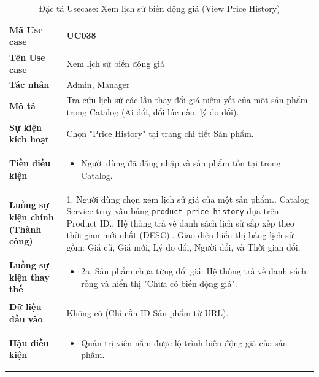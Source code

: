 \documentclass[12pt,a4paper]{report}
\begin{document}
\begin{longtable}{|>{\raggedright\arraybackslash\bfseries}p{4.5cm}|p{11cm}|}
\caption{Đặc tả Usecase: Xem lịch sử biến động giá (View Price History)} \label{tab:uc_038} \\
\hline
Mã Use case & UC038 \\ \hline
Tên Use case & Xem lịch sử biến động giá \\ \hline
Tác nhân & Admin, Manager \\ \hline
Mô tả & Tra cứu lịch sử các lần thay đổi giá niêm yết của một sản phẩm trong Catalog (Ai đổi, đổi lúc nào, lý do đổi). \\ \hline
Sự kiện kích hoạt & Chọn "Price History" tại trang chi tiết Sản phẩm. \\ \hline
Tiền điều kiện & 
\begin{itemize}[leftmargin=*, nosep, topsep=0pt, partopsep=0pt]
    \item Người dùng đã đăng nhập và sản phẩm tồn tại trong Catalog.
\end{itemize} \\ \hline
Luồng sự kiện chính (Thành công) & 
1. Người dùng chọn xem lịch sử giá của một sản phẩm.\newline
2. Catalog Service truy vấn bảng \texttt{product\_price\_history} dựa trên Product ID.\newline
3. Hệ thống trả về danh sách lịch sử sắp xếp theo thời gian mới nhất (DESC).\newline
4. Giao diện hiển thị bảng lịch sử gồm: Giá cũ, Giá mới, Lý do đổi, Người đổi, và Thời gian đổi. \\ \hline
Luồng sự kiện thay thế & 
\begin{itemize}[leftmargin=*, nosep, topsep=0pt, partopsep=0pt]
    \item 2a. Sản phẩm chưa từng đổi giá: Hệ thống trả về danh sách rỗng và hiển thị "Chưa có biến động giá".
\end{itemize} \\ \hline
Dữ liệu đầu vào & Không có (Chỉ cần ID Sản phẩm từ URL). \\ \hline
Hậu điều kiện & 
\begin{itemize}[leftmargin=*, nosep, topsep=0pt, partopsep=0pt]
    \item Quản trị viên nắm được lộ trình biến động giá của sản phẩm.
\end{itemize} \\ \hline
\end{longtable}

\vspace{0.5cm}
\end{document}
